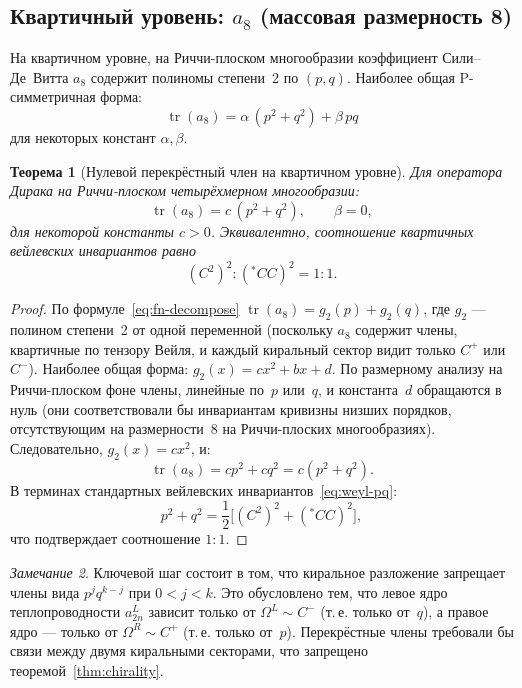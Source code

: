 \documentclass[12pt,a4paper]{article}
\newtheorem{theorem}{Теорема}[section]
\theoremstyle{definition}
\theoremstyle{remark}
\newtheorem{remark}[theorem]{Замечание}
\newcommand{\tr}{\operatorname{tr}}
\begin{document}
\subsection{Квартичный уровень: \texorpdfstring{$a_8$}{a8} (массовая размерность 8)}
\label{sec:a8}

На квартичном уровне, на Риччи-плоском многообразии коэффициент
Сили--Де~Витта $a_8$ содержит полиномы степени~2 по $(p, q)$.
Наиболее общая P-симметричная форма:
\begin{equation}\label{eq:a8-general}
  \tr(a_8) = \alpha\,(p^2 + q^2) + \beta\,pq
\end{equation}
для некоторых констант $\alpha, \beta$.

\begin{theorem}[Нулевой перекрёстный член на квартичном уровне]
\label{thm:zero-pq}
Для оператора Дирака на Риччи-плоском четырёхмерном многообразии:
\begin{equation}\label{eq:a8-result}
  \tr(a_8) = c\,(p^2 + q^2), \qquad \beta = 0,
\end{equation}
для некоторой константы $c > 0$.  Эквивалентно, соотношение квартичных
вейлевских инвариантов равно
\begin{equation}\label{eq:ratio}
  (C^2)^2 : (\!{}^{\ast}\!CC)^2 = 1 {:} 1.
\end{equation}
\end{theorem}

\begin{proof}
По формуле~\eqref{eq:fn-decompose} $\tr(a_8) = g_2(p) + g_2(q)$, где
$g_2$ --- полином степени~2 от одной переменной (поскольку $a_8$ содержит
члены, квартичные по тензору Вейля, и каждый киральный сектор видит
только $C^+$ или $C^-$).  Наиболее общая форма: $g_2(x) = cx^2 + bx + d$.
По размерному анализу на Риччи-плоском фоне члены, линейные по~$p$
или~$q$, и константа~$d$ обращаются в нуль (они соответствовали бы
инвариантам кривизны низших порядков, отсутствующим на размерности~8
на Риччи-плоских многообразиях).  Следовательно, $g_2(x) = cx^2$, и:
\begin{equation}
  \tr(a_8) = cp^2 + cq^2 = c(p^2 + q^2).
\end{equation}
В терминах стандартных вейлевских инвариантов~\eqref{eq:weyl-pq}:
\begin{equation}
  p^2 + q^2 = \frac{1}{2}\bigl[(C^2)^2 + ({}^{\ast}\!CC)^2\bigr],
\end{equation}
что подтверждает соотношение $1{:}1$.
\end{proof}

\begin{remark}
Ключевой шаг состоит в том, что киральное разложение запрещает члены вида
$p^j q^{k-j}$ при $0 < j < k$.  Это обусловлено тем, что левое ядро
теплопроводности $a_{2n}^L$ зависит только от $\Omega^L \sim C^-$ (т.\,е.
только от~$q$), а правое ядро --- только от $\Omega^R \sim C^+$ (т.\,е.
только от~$p$).  Перекрёстные члены требовали бы связи между двумя
киральными секторами, что запрещено теоремой~\ref{thm:chirality}.
\end{remark}
\end{document}
